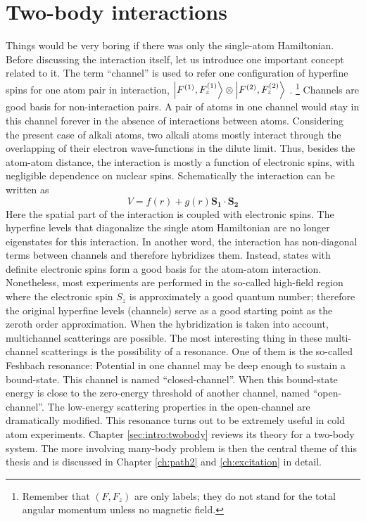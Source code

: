 \section{Two-body interactions}
Things would be very boring if there was only the single-atom Hamiltonian.  Before discussing the interaction itself, let us introduce one important concept related to it.    The term ``channel'' is used to refer one  configuration of hyperfine spins for one atom pair in interaction, $\left|F^{(1)},F_{z}^{(1)}\right>\otimes\left|F^{(2)},F_{z}^{(2)}\right>$ . \footnote{Remember that $(F,F_{z})$ are only labels; they do not stand for the total angular momentum unless no magnetic field.\label{foot:intro:f}}    Channels are good basis for non-interaction pairs.  A pair of atoms in one channel would stay in this channel  forever in the absence of  interactions between atoms.  Considering the present case of alkali atoms, two alkali atoms mostly interact  through the overlapping of their electron wave-functions in the dilute limit.  Thus, besides the atom-atom distance, the interaction is mostly a function of electronic spins, with negligible dependence on nuclear spins.  Schematically the interaction can be written as 
\begin{equation}\label{eq:intro:two}
V=f(r)+g(r)\mathbf{S_{1}}\cdot\mathbf{S_{2}}
\end{equation}
Here the spatial part of the interaction is coupled with electronic spins. The hyperfine levels that diagonalize the single atom Hamiltonian are no longer eigenstates for this interaction.  In another word, the interaction has non-diagonal terms between channels and therefore hybridizes them. Instead, states with definite electronic spins form a good basis for the atom-atom interaction.  Nonetheless, most experiments are performed in the so-called high-field region where the electronic spin $S_z$ is approximately a good quantum number; therefore the original hyperfine levels (channels) serve as a good starting point as the zeroth order approximation.  When the hybridization is taken into account, multichannel scatterings are possible.  The most interesting thing in these multi-channel scatterings is the possibility of a resonance.  One of them is the so-called Feshbach resonance:  Potential in one channel may be deep enough to sustain a bound-state. This channel is named ``closed-channel''. When this bound-state energy is close to the zero-energy threshold of another channel, named ``open-channel''.  The low-energy scattering properties in the open-channel are dramatically modified.  This resonance turns out to be extremely useful in   cold atom experiments.  Chapter \ref{sec:intro:twobody} reviews its theory for  a two-body system. The more involving many-body problem is then the central theme of this thesis and is discussed in Chapter \ref{ch:path2} and \ref{ch:excitation} in detail. 

